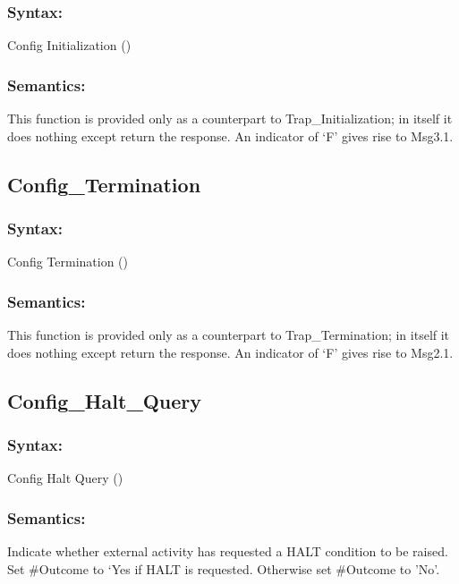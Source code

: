 \subsubsection{Syntax:}\label{syntax-41}

Config Initialization ()

\subsubsection{Semantics:}\label{semantics-42}

This function is provided only as a counterpart to Trap\_Initialization;
in itself it does nothing except return the response. An indicator of
`F' gives rise to Msg3.1.

\subsection{Config\_Termination}\label{config_termination}

\subsubsection{Syntax:}\label{syntax-42}

Config Termination ()

\subsubsection{Semantics:}\label{semantics-43}

This function is provided only as a counterpart to Trap\_Termination; in
itself it does nothing except return the response. An indicator of `F'
gives rise to Msg2.1.

\subsection{Config\_Halt\_Query}\label{config_halt_query}

\subsubsection{Syntax:}\label{syntax-43}

Config Halt Query ()

\subsubsection{Semantics:}\label{semantics-44}

Indicate whether external activity has requested a HALT condition to be
raised. Set \#Outcome to `Yes if HALT is requested. Otherwise set
\#Outcome to 'No'.

